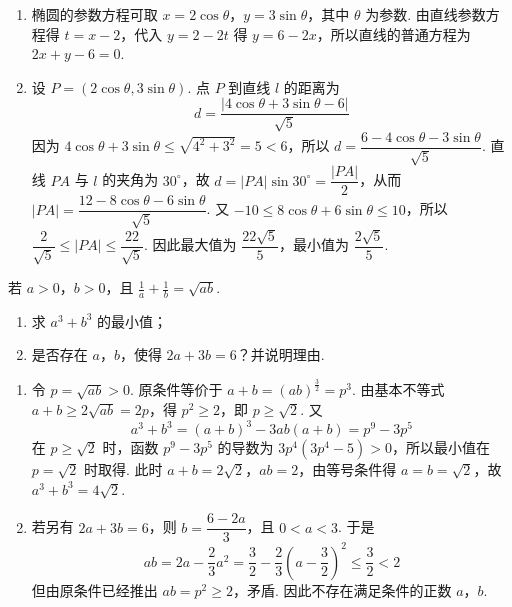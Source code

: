 \begin{solution}
\begin{enumerate}
\item 椭圆的参数方程可取 \(x=2\cos\theta\)，\(y=3\sin\theta\)，其中 \(\theta\) 为参数. 由直线参数方程得 \(t=x-2\)，代入 \(y=2-2t\) 得 \(y=6-2x\)，所以直线的普通方程为 \(2x+y-6=0\).
\item 设 \(P=(2\cos\theta,3\sin\theta)\). 点 \(P\) 到直线 \(l\) 的距离为
\[d=\frac{|4\cos\theta+3\sin\theta-6|}{\sqrt5}\]
因为 \(4\cos\theta+3\sin\theta\leqslant\sqrt{4^2+3^2}=5<6\)，所以 \(d=\dfrac{6-4\cos\theta-3\sin\theta}{\sqrt5}\). 直线 \(PA\) 与 \(l\) 的夹角为 \(30^\circ\)，故 \(d=|PA|\sin30^\circ=\dfrac{|PA|}{2}\)，从而 \(|PA|=\dfrac{12-8\cos\theta-6\sin\theta}{\sqrt5}\). 又 \(-10\leqslant8\cos\theta+6\sin\theta\leqslant10\)，所以 \(\dfrac{2}{\sqrt5}\leqslant|PA|\leqslant\dfrac{22}{\sqrt5}\). 因此最大值为 \(\dfrac{22\sqrt5}{5}\)，最小值为 \(\dfrac{2\sqrt5}{5}\).
\end{enumerate}
\end{solution}

\begin{problem}
若 \(a > 0\)，\(b > 0\)，且 \(\frac{1}{a} + \frac{1}{b} = \sqrt{ab}\).

\begin{enumerate}
\item 求 \(a^{3} + b^{3}\) 的最小值；
\item 是否存在 \(a\)，\(b\)，使得 \(2a + 3b = 6\)？并说明理由.
\end{enumerate}
\end{problem}

\begin{solution}
\begin{enumerate}
\item 令 \(p=\sqrt{ab}>0\). 原条件等价于 \(a+b=(ab)^{\frac{3}{2}}=p^3\). 由基本不等式 \(a+b\geqslant2\sqrt{ab}=2p\)，得 \(p^2\geqslant2\)，即 \(p\geqslant\sqrt2\). 又
\[a^3+b^3=(a+b)^3-3ab(a+b)=p^9-3p^5\]
在 \(p\geqslant\sqrt2\) 时，函数 \(p^9-3p^5\) 的导数为 \(3p^4(3p^4-5)>0\)，所以最小值在 \(p=\sqrt2\) 时取得. 此时 \(a+b=2\sqrt2\)，\(ab=2\)，由等号条件得 \(a=b=\sqrt2\)，故 \(a^3+b^3=4\sqrt2\).
\item 若另有 \(2a+3b=6\)，则 \(b=\dfrac{6-2a}{3}\)，且 \(0<a<3\). 于是
\[ab=2a-\frac23a^2=\frac32-\frac23\left(a-\frac32\right)^2\leqslant\frac32<2\]
但由原条件已经推出 \(ab=p^2\geqslant2\)，矛盾. 因此不存在满足条件的正数 \(a\)，\(b\).
\end{enumerate}
\end{solution}
